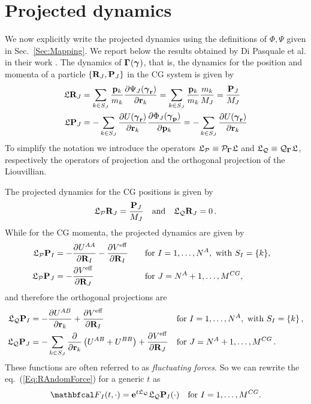 \documentclass[10pt,a4paper]{book}
\theoremstyle{definition}
\begin{document}
\section{Projected dynamics}
\label{sec:projcoor}
We now explicitly write the projected dynamics using the definitions of $\Phi,\Psi$ given in Sec.~\ref{Sec:Mapping}. We report below the results obtained by Di Pasquale et al. in their work \cite{DiPasquale2019}. The dynamics of $\boldsymbol\Gamma_{}(\boldsymbol\gamma_{})$, that is, the dynamics for the position and momenta of a particle $\{\mathbf{R}_{J},\mathbf{P}_{J}\}$ in the CG system is given by
%
\begin{align*}
	\mathfrak{L}\mathbf{R}_{J} & = \sum_{k\in S_J}{\frac{\mathbf{p}_k}{m_k}\frac{\partial\Psi_J(\boldsymbol\gamma_{\mathbf{r}})}{\partial\mathbf{r}_k}}  = \sum_{k\in S_J}{\frac{\mathbf{p}_k}{m_k}\frac{m_k}{M_J}}  = \frac{\mathbf{P}_J }{M_{J}}  \\
	\mathfrak{L}\mathbf{P}_{J} & = -\sum_{k\in S_J}{\frac{\partial U(\boldsymbol\gamma_{\mathbf{r}})}{\partial\mathbf{r}_k}}\frac{\partial\Phi_J(\boldsymbol\gamma_{\mathbf{p}})}{\partial\mathbf{p}_k}  = -\sum_{k\in S_J}{\frac{\partial U(\boldsymbol\gamma_{\mathbf{r}})}{\partial\mathbf{r}_k}}
\end{align*}
%
To simplify the notation we introduce the operators $\mathfrak{L}_{\mathcal{P}} \equiv \mathcal{P}_{\boldsymbol\Gamma_{}}\mathfrak{L}$ and $\mathfrak{L}_{\mathcal{Q}} \equiv \mathcal{Q}_{\boldsymbol\Gamma_{}}\mathfrak{L}$, respectively the operators of projection and the orthogonal projection of the Liouvillian.

\noindent
The projected dynamics for the CG positions is given by 
\begin{equation*}
    \mathfrak{L}_{\mathcal{P}}\mathbf{R}_{J} = \frac{\mathbf{P}_J}{M_J} \quad\text{and}\quad \mathfrak{L}_{\mathcal{Q}}\mathbf{R}_{J} = 0\,. 
\end{equation*}
While for the CG momenta, the projected dynamics are given by
%
\begin{equation*}
  \begin{aligned}
    \mathfrak{L}_{\mathcal{P}}\mathbf{P}_{I} & = -\frac{\partial U^{AA}}{\partial\mathbf{R}_I} - \frac{\partial V^{\mathrm{eff}}}{\partial\mathbf{R}_{I}}	&\quad&\text{for }I=1,\ldots,N_{}^A,\text{ with }S_I=\{k\},&\\
    \mathfrak{L}_{\mathcal{P}}\mathbf{P}_{J} & = - \frac{\partial V^{\mathrm{eff}}}{\partial\mathbf{R}_{J}}	 &\quad&\text{for }J=N_{}^A+1,\ldots,M^{CG},&
  \end{aligned}
\end{equation*}
% 
and therefore the orthogonal projections are
%
\begin{align*}
  \mathfrak{L}_{\mathcal{Q}}\mathbf{P}_{I} &= -\frac{\partial U^{AB}}{\partial\mathbf{r}_k}  + \frac{\partial V^{\mathrm{eff}}}{\partial\mathbf{R}_I} &  & \text{for }I=1,\dots,N_{}^A,\text{ with }S_I=\{k\}\,,\\
  \mathfrak{L}_{\mathcal{Q}}\mathbf{P}_{J} &= -\sum_{k\in S_J}{\frac{\partial}{\partial\mathbf{r}_k}\left(U^{AB}+U^{BB}\right) } + \frac{\partial V^{\mathrm{eff}}}{\partial\mathbf{R}_J} &  & \text{for }J=N^A+1,\dots,M^{CG}\,.
\end{align*}
% 
These functions are often referred to as \emph{fluctuating forces}. So we can rewrite the eq.~(\ref{Eq:RAndomForce}) for a generic $t$ as 
\begin{equation}
\label{Eq:StocFor}
 \fprojbf_{I}(t,\cdot) = \exp{t\Lio_\qproj}\Lio_\qproj\bfP_I(\cdot) \quad \text{for } I=1,\dots,\ncg.
\end{equation}
\end{document}
